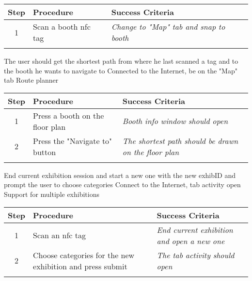 \begin{center}
\begin{tabular}{| c | p{4.6cm} | p{4.6cm} |}
\hline
\textbf{Step} & \textbf{Procedure} & \textbf{Success Criteria}\\
\hline
1 & Scan a booth \ac{nfc} tag& \textit{Change to "Map" tab and snap to booth}\\
\hline
\multicolumn{3}{c}{} \\%
\end{tabular}
\end{center}

\testcase
{\caseeight}
{The user should get the shortest path from where he last scanned a tag and to the booth he wants to navigate to}
{Connected to the Internet, be on the "Map" tab}
{Route planner}

\begin{center}
\begin{tabular}{| c | p{4.6cm} | p{4.6cm} |}
\hline
\textbf{Step} & \textbf{Procedure} & \textbf{Success Criteria}\\
\hline
1 & Press a booth on the floor plan & \textit{Booth info window should open}\\
\hline
2 & Press the "Navigate to" button & \textit{The shortest path should be drawn on the floor plan}\\
\hline
\multicolumn{3}{c}{} \\%
\end{tabular}
\end{center}

\testcase
{\casenine}
{End current exhibition session and start a new one with the new exhibID and prompt the user to choose categories}
{Connect to the Internet, tab activity open}
{Support for multiple exhibitions}
\begin{center}
\begin{tabular}{| c | p{4.6cm} | p{4.6cm} |}
\hline
\textbf{Step} & \textbf{Procedure} & \textbf{Success Criteria}\\
\hline
1 & Scan an \ac{nfc} tag & \textit{End current exhibition and open a new one}\\
\hline
2 & Choose categories for the new exhibition and press submit & \textit{The tab activity should open}\\
\hline
\multicolumn{3}{c}{} \\%
\end{tabular}
\end{center}

